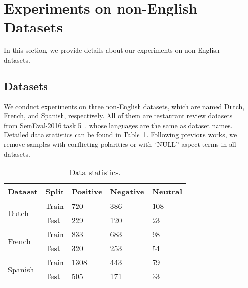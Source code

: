 \documentclass[11pt]{article}
\begin{document}






\appendix
\section{Experiments on non-English Datasets}
In this section, we provide details about our experiments on non-English datasets.
\subsection{Datasets}

We conduct experiments on  three non-English datasets, which are named Dutch, French, and Spanish, respectively. All of them are restaurant review datasets from SemEval-2016 task 5~\citep{DBLP:conf/semeval/PontikiGPAMAAZQ16}, whose languages are the same as dataset names. Detailed  data statistics can be found in Table~\ref{tb:data}. Following previous works, we remove samples with conflicting polarities or with ``NULL'' aspect terms in all datasets.

\begin{table}[h]
  \centering\small
  \setlength\tabcolsep{1pt}
  \begin{tabular}{m{2.1cm}m{1.1cm}<{\centering}m{1.4cm}<{\centering}m{1.5cm}<{\centering}m{1.4cm}<{\centering}}
    \toprule
    \textbf{Dataset}         & \textbf{Split} & \textbf{Positive} & \textbf{Negative} & \textbf{Neutral} \\\midrule
\multirow{2}{*}{Dutch}   & Train          & 720               & 386               & 108              \\
                             & Test           & 229               & 120               & 23               \\\midrule
    \multirow{2}{*}{French}  & Train          & 833               & 683               & 98               \\
                             & Test           & 320               & 253               & 54               \\\midrule
    \multirow{2}{*}{Spanish} & Train          & 1308              & 443               & 79               \\
                             & Test           & 505               & 171               & 33               \\
    \bottomrule
  \end{tabular}\caption{Data statistics.}
  \label{tb:data}
\end{table}
\end{document}
